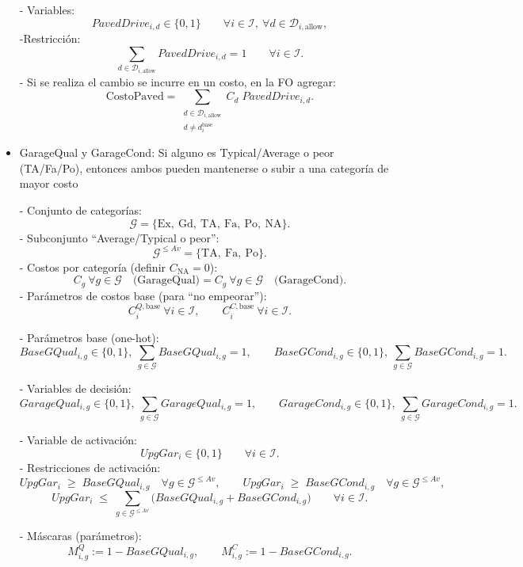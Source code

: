 \begin{itemize}
- Variables:
\[
  PavedDrive_{i,d} \in \{0,1\} \qquad \forall i \in \mathcal{I},\ \forall d \in \mathcal{D}_{i,\text{allow}},
\]
-Restricción:
\[
  \sum_{d \in \mathcal{D}_{i,\text{allow}}} PavedDrive_{i,d} = 1 \qquad \forall i \in \mathcal{I}.
\]
- Si se realiza el cambio se incurre en un costo, en la FO agregar:
\[
  \text{CostoPaved}
  =
  \sum_{\substack{d \in \mathcal{D}_{i,\text{allow}} \\ d \neq d_i^{\text{base}}}}
  C_d \; PavedDrive_{i,d}.
\]

    \item GarageQual y GarageCond: Si alguno es Typical/Average o peor (TA/Fa/Po), entonces ambos pueden mantenerse o subir a una categoría de mayor costo 

- Conjunto de categorías:
\[
  \mathcal{G}=\{\text{Ex},\ \text{Gd},\ \text{TA},\ \text{Fa},\ \text{Po},\ \text{NA}\}.
\]
- Subconjunto “Average/Typical o peor”:
\[
  \mathcal{G}^{\le Av}=\{\text{TA},\ \text{Fa},\ \text{Po}\}.
\]
- Costos por categoría (definir $C_{\text{NA}}=0$):
\[
  C_g \ \forall g\in\mathcal{G} \quad \text{(GarageQual)} 
  =
  C_g \ \forall g\in\mathcal{G} \quad \text{(GarageCond)}.
\]
- Parámetros de costos base (para “no empeorar”):
\[
  C^{Q,\text{base}}_i \ \forall i\in\mathcal{I}, 
  \qquad
  C^{C,\text{base}}_i \ \forall i\in\mathcal{I}.
\]

- Parámetros base (one-hot):
\[
  BaseGQual_{i,g}\in\{0,1\},\ \sum_{g\in\mathcal{G}} BaseGQual_{i,g}=1,
 \qquad
  BaseGCond_{i,g}\in\{0,1\},\ \sum_{g\in\mathcal{G}} BaseGCond_{i,g}=1.
\]

- Variables de decisión:
\[
  GarageQual_{i,g}\in\{0,1\},\ \sum_{g\in\mathcal{G}} GarageQual_{i,g}=1,
  \qquad
  GarageCond_{i,g}\in\{0,1\},\ \sum_{g\in\mathcal{G}} GarageCond_{i,g}=1.
\]

- Variable de activación:
\[
  UpgGar_i \in \{0,1\} \qquad \forall i\in\mathcal{I}.
\]
- Restricciones de activación:
\[
  UpgGar_i \;\ge\; BaseGQual_{i,g} \quad \forall g\in\mathcal{G}^{\le Av}, 
  \qquad
  UpgGar_i \;\ge\; BaseGCond_{i,g} \quad \forall g\in\mathcal{G}^{\le Av},
\]
\[
  UpgGar_i \;\le\; \sum_{g\in\mathcal{G}^{\le Av}}\!\Big( BaseGQual_{i,g}+BaseGCond_{i,g}\Big)
  \qquad \forall i\in\mathcal{I}.
\]

- Máscaras (parámetros):
\[
M^{Q}_{i,g} := 1 - BaseGQual_{i,g},\qquad
M^{C}_{i,g} := 1 - BaseGCond_{i,g}.
\]


\end{itemize}
